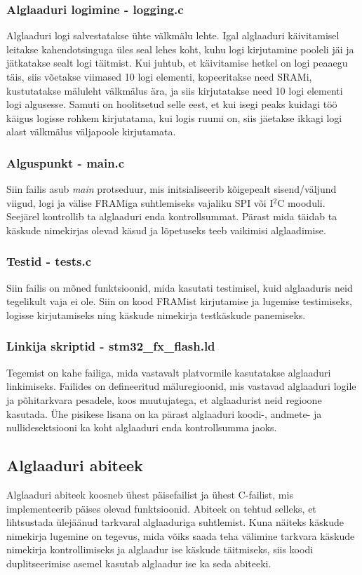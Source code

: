 \documentclass[12pt,a4paper]{article}
\newcommand{\iic}{I${}^2$C }
\begin{document}
\subsubsection{Alglaaduri logimine - \textbf{logging.c}}
Alglaaduri logi salvestatakse ühte välkmälu lehte. Igal alglaaduri käivitamisel
leitakse kahendotsinguga üles seal lehes koht, kuhu logi kirjutamine pooleli jäi
ja jätkatakse sealt logi täitmist. Kui juhtub, et käivitamise hetkel on logi
peaaegu täis, siis võetakse viimased 10 logi elementi, kopeeritakse need SRAMi,
kustutatakse mäluleht välkmälus ära, ja siis kirjutatakse need 10 logi elementi
logi algusesse. Samuti on hoolitsetud selle eest, et kui isegi peaks kuidagi töö
käigus logisse rohkem kirjutatama, kui logis ruumi on, siis jäetakse ikkagi logi
alast välkmälus väljapoole kirjutamata.

\subsubsection{Alguspunkt - \textbf{main.c}}
Siin failis asub \textit{main} protseduur, mis initsialiseerib kõigepealt
sisend/väljund viigud, logi ja välise FRAMiga suhtlemiseks vajaliku SPI või \iic
mooduli. Seejärel kontrollib ta alglaaduri enda kontrollsummat. Pärast mida
täidab ta käskude nimekirjas olevad käsud ja lõpetuseks teeb vaikimisi
alglaadimise.

\subsubsection{Testid - \textbf{tests.c}}
Siin failis on mõned funktsioonid, mida kasutati testimisel, kuid alglaaduris
neid tegelikult vaja ei ole. Siin on kood FRAMist kirjutamise ja lugemise
testimiseks, logisse kirjutamiseks ning käskude nimekirja testkäskude
panemiseks.

\subsubsection{Linkija skriptid - \textbf{stm32\_fx\_flash.ld}}
Tegemist on kahe failiga, mida vastavalt platvormile kasutatakse alglaaduri
linkimiseks. Failides on defineeritud mäluregioonid, mis vastavad alglaaduri
logile ja põhitarkvara pesadele, koos muutujatega, et alglaadurist neid regioone
kasutada. Ühe pisikese lisana on ka pärast alglaaduri koodi-, andmete- ja
nullidesektsiooni ka koht alglaaduri enda kontrollsumma jaoks.

\subsection{Alglaaduri abiteek}
Alglaaduri abiteek koosneb ühest päisefailist ja ühest C-failist, mis
implementeerib päises olevad funktsioonid. Abiteek on tehtud selleks, et
lihtsustada ülejäänud tarkvaral alglaaduriga suhtlemist. Kuna näiteks käskude
nimekirja lugemine on tegevus, mida võiks saada teha välimine tarkvara käskude
nimekirja kontrollimiseks ja alglaadur ise käskude täitmiseks, siis koodi
duplitseerimise asemel kasutab alglaadur ise ka seda abiteeki.
\end{document}
